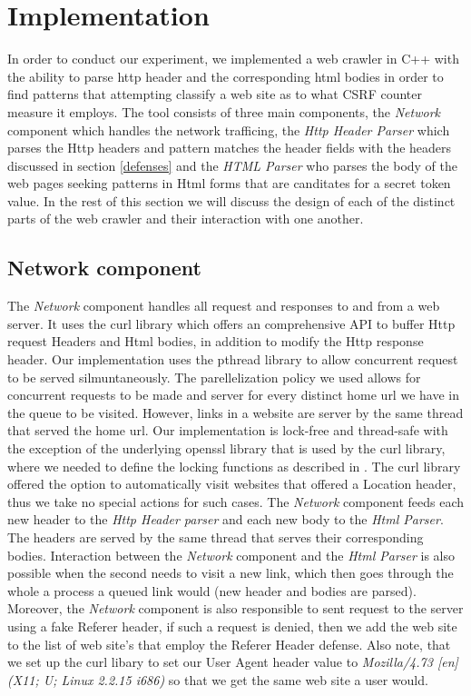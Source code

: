 \label{implementation}
\section{Implementation} 
In order to conduct our experiment, we implemented a web crawler in C++ with the ability to parse http header and the 
corresponding html bodies in order to find patterns that attempting classify a web site as to what CSRF counter measure it
employs. The tool consists of three main components, the \emph{Network} component 
which handles the network trafficing, the \emph{Http Header Parser} which parses the Http headers and pattern matches 
the header fields with the headers discussed in section \ref{defenses} and the \emph{HTML Parser} who parses the body of 
the web pages seeking patterns in Html forms that are canditates for a secret token value.  In the rest of this section we will 
discuss the design of each of the distinct parts of the web crawler and their interaction with one another.

\subsection{Network component}
The \emph{Network} component handles all request and responses to and from a web server.  It uses the curl library 
\cite{website:curl}
which offers an comprehensive API to buffer Http request Headers and Html bodies, in addition to modify the Http response 
header.  Our implementation uses the pthread library to allow concurrent request to be served silmuntaneously.  The 
parellelization policy we used allows for concurrent requests to be made and server for every distinct home url we have
in the queue to be visited.  However, links in a website are server by the same thread that served the home url.  Our 
implementation is lock-free and thread-safe with the exception of the underlying openssl library that is used by 
the curl library, where we needed to define the locking functions as described in \cite{website:openssl-threads}.  The curl 
library offered the option to automatically visit websites that offered a Location header, thus we take no special
actions for such cases.  The \emph{Network} component feeds each new header to the \emph{Http Header parser} and 
each new body to the \emph{Html Parser}.  The headers are served by the same thread that serves their corresponding
bodies.  Interaction between the \emph{Network} component and the \emph{Html Parser} is also possible when the second
needs to visit a new link, which then goes through the whole a process a queued link would (new header and bodies are
parsed). Moreover, the \emph{Network} component is also responsible to sent request to the server using a fake Referer
header, if such a request is denied, then we add the web site to the list of web site's that employ the Referer Header
defense.  Also note, that we set up the curl libary to set our User Agent header value to 
\emph{Mozilla/4.73 [en] (X11; U; Linux 2.2.15 i686)} so that we get the same web site a user would.

